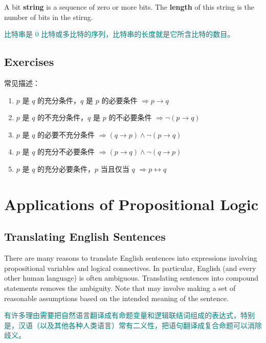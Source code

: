 \documentclass[12pt, a4paper]{article} %
\begin{document}
\begin{definition}
    A bit \textbf{string} is a sequence of zero or more bits. The \textbf{length} of this string is the number of bits in the stirng.
\end{definition}

\begin{theorem}
    \textcolor{teal}{
        比特串是 $0$ 比特或多比特的序列，比特串的长度就是它所含比特的数目。
    }
\end{theorem}

\subsection{Exercises}

常见描述：

\begin{enumerate}[\hspace{2em} i.]
    \item $p$ 是 $q$ 的充分条件，$q$ 是 $p$ 的必要条件 $\Rightarrow p \to q$
    \item $p$ 是 $q$ 的不充分条件，$q$ 是 $p$ 的不必要条件 $\Rightarrow \neg (p \to q)$
    \item $p$ 是 $q$ 的必要不充分条件 $\Rightarrow (q \to p) \wedge \neg (p \to q)$
    \item $p$ 是 $q$ 的充分不必要条件 $\Rightarrow (p \to q) \wedge \neg (q \to p)$
    \item $p$ 是 $q$ 的充分必要条件，$p$ 当且仅当 $q$ $\Rightarrow p \leftrightarrow q$
\end{enumerate}

\section{Applications of Propositional Logic}
\subsection{Translating English Sentences}

There are many reasons to translate English sentences into expressions involving propositional variables and logical connectives. In particular, English (and every other human language) is often ambiguous.
Translating sentences into compound statements removes the ambiguity. Note that may involve making a set of reasonable assumptions based on the intended meaning of the sentence.

\textcolor{teal}{
    有许多理由需要把自然语言翻译成有命题变量和逻辑联结词组成的表达式，特别是，汉语（以及其他各种人类语言）常有二义性，把语句翻译成复合命题可以消除歧义。
}
\end{document}
